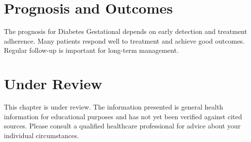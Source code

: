 \section*{Prognosis and Outcomes}
The prognosis for Diabetes Gestational depends on early detection and treatment adherence. Many patients respond well to treatment and achieve good outcomes. Regular follow-up is important for long-term management.
\section*{Under Review}
This chapter is under review. The information presented is general health information for educational purposes and has not yet been verified against cited sources. Please consult a qualified healthcare professional for advice about your individual circumstances.


\clearpage
